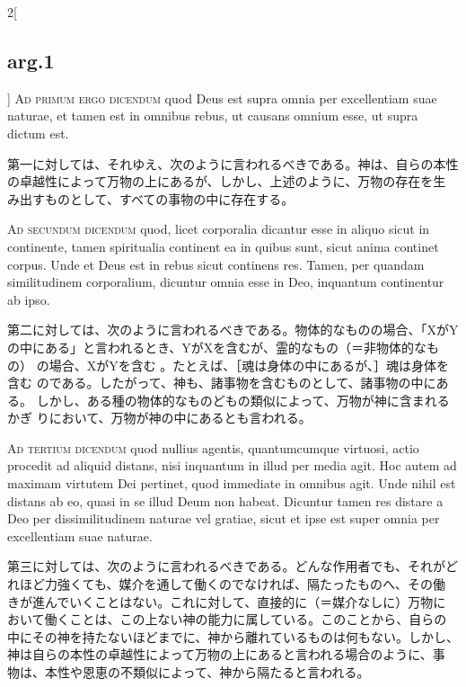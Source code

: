 \documentclass[paper=a4paper,fontsize=10pt,jafontsize=9pt,titlepage]{jlreq}
\begin{document}
\begin{paracol}{2}[\subsection{arg.1}]
{\scshape Ad primum ergo dicendum} quod Deus est supra omnia per excellentiam
 suae naturae, et tamen est in omnibus rebus, ut causans omnium esse, ut
 supra dictum est.

\switchcolumn

第一に対しては、それゆえ、次のように言われるべきである。神は、自らの本性
 の卓越性によって万物の上にあるが、しかし、上述のように、万物の存在を生
 み出すものとして、すべての事物の中に存在する。

\switchcolumn*[\subsection{ad.2}]

{\scshape Ad secundum dicendum} quod, licet corporalia dicantur esse in aliquo
 sicut in continente, tamen spiritualia continent ea in quibus sunt,
 sicut anima continet corpus. Unde et Deus est in rebus sicut continens
 res. Tamen, per quandam similitudinem corporalium, dicuntur omnia esse
 in Deo, inquantum continentur ab ipso.

\switchcolumn

第二に対しては、次のように言われるべきである。物体的なものの場合、「XがY
 の中にある」と言われるとき、YがXを含むが、霊的なもの（＝非物体的なもの）
 の場合、XがYを含む 。たとえば、［魂は身体の中にあるが、］魂は身体を含む
 のである。したがって、神も、諸事物を含むものとして、諸事物の中にある。
 しかし、ある種の物体的なものどもの類似によって、万物が神に含まれるかぎ
 りにおいて、万物が神の中にあるとも言われる。

\switchcolumn*[\subsection{ad.3}]

{\scshape Ad tertium dicendum} quod nullius agentis, quantumcumque virtuosi,
 actio procedit ad aliquid distans, nisi inquantum in illud per media
 agit. Hoc autem ad maximam virtutem Dei pertinet, quod immediate in
 omnibus agit. Unde nihil est distans ab eo, quasi in se illud Deum non
 habeat. Dicuntur tamen res distare a Deo per dissimilitudinem naturae
 vel gratiae, sicut et ipse est super omnia per excellentiam suae
 naturae.

\switchcolumn

第三に対しては、次のように言われるべきである。どんな作用者でも、それがど
 れほど力強くても、媒介を通して働くのでなければ、隔たったものへ、その働
 きが進んでいくことはない。これに対して、直接的に（＝媒介なしに）万物に
 おいて働くことは、この上ない神の能力に属している。このことから、自らの
 中にその神を持たないほどまでに、神から離れているものは何もない。しかし、
 神は自らの本性の卓越性によって万物の上にあると言われる場合のように、事
 物は、本性や恩恵の不類似によって、神から隔たると言われる。


\end{paracol}
\end{document}

